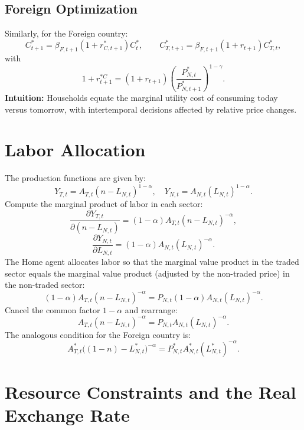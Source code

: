 \documentclass[a4paper,12pt]{article} %
\theoremstyle{nonitalic}
\begin{document}
\subsection*{Foreign Optimization}
Similarly, for the Foreign country:
\[
\boxed{C^*_{t+1} = \beta_{F,t+1} (1+r^*_{C,t+1}) C^*_t, \qquad C^*_{T,t+1} = \beta_{F,t+1} (1+r_{t+1}) C^*_{T,t},}
\]
with
\[
1+r_{t+1}^{*C} = (1+r_{t+1}) \left(\frac{P^*_{N,t}}{P^*_{N,t+1}}\right)^{1-\gamma}.
\]
\textbf{Intuition:} Households equate the marginal utility cost of consuming today versus tomorrow, with intertemporal decisions affected by relative price changes.

\section{Labor Allocation}

The production functions are given by:
\[
Y_{T,t} = A_{T,t}(n-L_{N,t})^{1-\alpha}, \quad Y_{N,t} = A_{N,t}(L_{N,t})^{1-\alpha}.
\]
Compute the marginal product of labor in each sector:
\[
\frac{\partial Y_{T,t}}{\partial (n-L_{N,t})} = (1-\alpha) A_{T,t}(n-L_{N,t})^{-\alpha},
\]
\[
\frac{\partial Y_{N,t}}{\partial L_{N,t}} = (1-\alpha) A_{N,t}(L_{N,t})^{-\alpha}.
\]
The Home agent allocates labor so that the marginal value product in the traded sector equals the marginal value product (adjusted by the non-traded price) in the non-traded sector:
\[
(1-\alpha)A_{T,t}(n-L_{N,t})^{-\alpha} = P_{N,t} (1-\alpha)A_{N,t}(L_{N,t})^{-\alpha}.
\]
Cancel the common factor \(1-\alpha\) and rearrange:
\[
\boxed{A_{T,t}(n-L_{N,t})^{-\alpha} = P_{N,t} A_{N,t}(L_{N,t})^{-\alpha}.}
\]
The analogous condition for the Foreign country is:
\[
\boxed{A^*_{T,t}\big((1-n)-L^*_{N,t}\big)^{-\alpha} = P^*_{N,t} A^*_{N,t}(L^*_{N,t})^{-\alpha}.}
\]

\section{Resource Constraints and the Real Exchange Rate}
\end{document}
